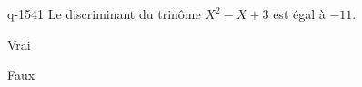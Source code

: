 \begin{truefalse}{q-1541}
Le discriminant du trinôme $X^2-X+3$ est égal à $-11$.
\item* Vrai
\item Faux
\end{truefalse}

